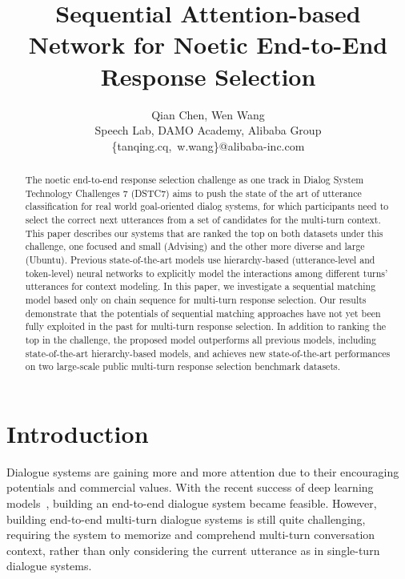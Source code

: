 \documentclass[letterpaper]{article} \usepackage{aaai19}  \usepackage{times}  \usepackage{helvet}  \usepackage{courier}  \usepackage{url}  \usepackage{graphicx}
\begin{document}
\title{Sequential Attention-based Network for Noetic End-to-End Response Selection}
\author{Qian Chen, Wen Wang \\
Speech Lab, DAMO Academy, Alibaba Group \\
\{tanqing.cq,~w.wang\}@alibaba-inc.com
}
\maketitle
\begin{abstract}
The noetic end-to-end response selection challenge as one track in Dialog System Technology Challenges 7 (DSTC7) aims to push the state of the art of utterance classification for real world goal-oriented dialog systems, for which participants need to select the correct next utterances from a set of candidates for the multi-turn context. This paper describes our systems that are ranked the top on both datasets under this challenge, one focused and small (Advising) and the other more diverse and large (Ubuntu). Previous state-of-the-art models use hierarchy-based (utterance-level and token-level) neural networks to explicitly model the interactions among different turns' utterances for context modeling. In this paper, we investigate a sequential matching model based only on chain sequence for multi-turn response selection. Our results demonstrate that the potentials of sequential matching approaches have not yet been fully exploited in the past for multi-turn response selection.  In addition to ranking the top in the challenge, the proposed model outperforms all previous models, including state-of-the-art hierarchy-based models, and achieves new state-of-the-art performances on two large-scale public multi-turn response selection benchmark datasets.

\end{abstract}
\section{Introduction}
Dialogue systems are gaining more and more attention due to their encouraging potentials and commercial values. With the recent success of deep learning models~\cite{DBLP:conf/aaai/SerbanSBCP16}, building an end-to-end dialogue system became feasible. However, building end-to-end multi-turn dialogue systems is still quite challenging, requiring the system to memorize and comprehend multi-turn
conversation context, rather than only considering the current utterance as in single-turn dialogue systems.
\end{document}
